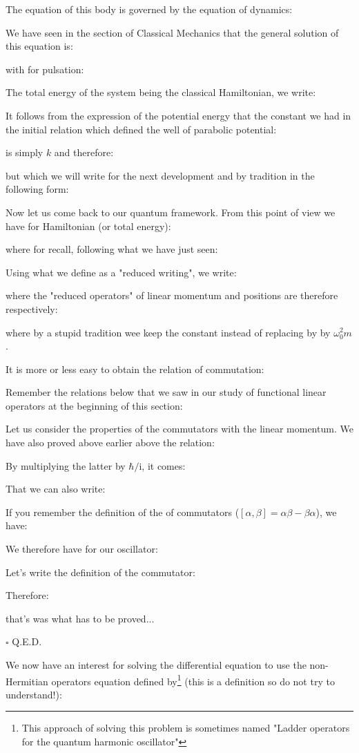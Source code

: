 	The equation of this body is governed by the equation of dynamics:
	
	We have seen in the section of Classical Mechanics that the general solution of this equation is:
	
	with for pulsation:
	
	The total energy of the system being the classical Hamiltonian, we write:
	
	It follows from the expression of the potential energy that the constant we had in the initial relation which defined the well of parabolic potential:
	
	is simply $k$ and therefore:
	
	but which we will write for the next development and by tradition in the following form:
	
	Now let us come back to our quantum framework. From this point of view we have for Hamiltonian (or total energy):
	
	where for recall, following what we have just seen:
	
	Using what we define as a "reduced writing", we write:
	
	where the "reduced operators" of linear momentum and positions are therefore respectively:
	
	where by a stupid tradition wee keep the constant instead of replacing by by $\omega_0^2m$.
	
	It is more or less easy to obtain the relation of commutation:
	
	\begin{dem}
	Remember the relations below that we saw in our study of functional linear operators at the beginning of this section:
	
	Let us consider the properties of the commutators with the linear momentum. We have also proved above earlier above the relation:
	
	By multiplying the latter by $\hbar/\mathrm{i}$, it comes:
	
	That we can also write:
	
	If you remember the definition of the of commutators ($[\alpha,\beta]=\alpha\beta-\beta\alpha$), we have:
	
	We therefore have for our oscillator:
	
	Let's write the definition of the commutator:
	
	Therefore:
	
	that's was what has to be proved...
	\begin{flushright}
		$\square$  Q.E.D.
	\end{flushright}
	\end{dem}
	We now have an interest for solving the differential equation to use the non-Hermitian operators equation defined by\footnote{This approach of solving this problem is sometimes named "Ladder operators for the quantum harmonic oscillator"} (this is a definition so do not try to understand!):
	
